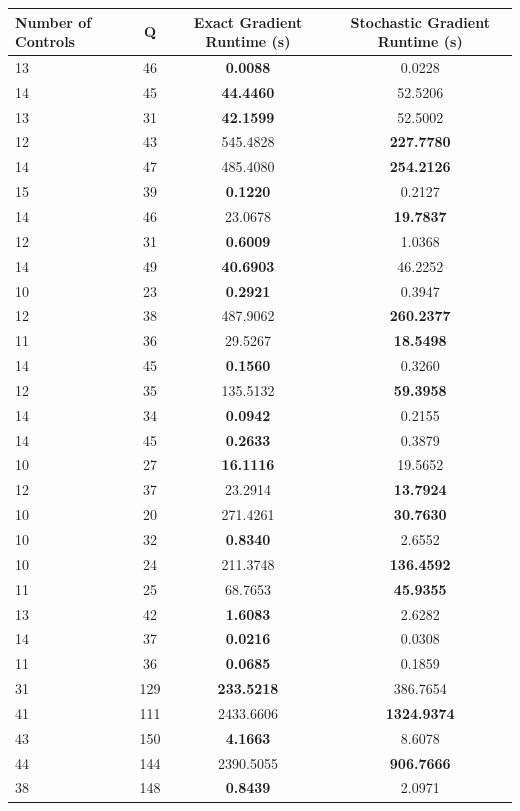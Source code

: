 \documentclass{article}
\begin{document}
\begin{table}[h]
\centering
\begin{tabular}{lccc}
\toprule
Number of Controls & Q & Exact Gradient Runtime (s) & Stochastic Gradient Runtime (s) \\
\midrule
13 & 46 & \textbf{0.0088} & 0.0228 \\
14 & 45 & \textbf{44.4460} & 52.5206 \\
13 & 31 & \textbf{42.1599} & 52.5002 \\
12 & 43 & 545.4828 & \textbf{227.7780} \\
14 & 47 & 485.4080 & \textbf{254.2126} \\
15 & 39 & \textbf{0.1220} & 0.2127 \\
14 & 46 & 23.0678 & \textbf{19.7837} \\
12 & 31 & \textbf{0.6009} & 1.0368 \\
14 & 49 & \textbf{40.6903} & 46.2252 \\
10 & 23 & \textbf{0.2921} & 0.3947 \\
12 & 38 & 487.9062 & \textbf{260.2377} \\
11 & 36 & 29.5267 & \textbf{18.5498} \\
14 & 45 & \textbf{0.1560} & 0.3260 \\
12 & 35 & 135.5132 & \textbf{59.3958} \\
14 & 34 & \textbf{0.0942} & 0.2155 \\
14 & 45 & \textbf{0.2633} & 0.3879 \\
10 & 27 & \textbf{16.1116} & 19.5652 \\
12 & 37 & 23.2914 & \textbf{13.7924} \\
10 & 20 & 271.4261 & \textbf{30.7630} \\
10 & 32 & \textbf{0.8340} & 2.6552 \\
10 & 24 & 211.3748 & \textbf{136.4592} \\
11 & 25 & 68.7653 & \textbf{45.9355} \\
13 & 42 & \textbf{1.6083} & 2.6282 \\
14 & 37 & \textbf{0.0216} & 0.0308 \\
11 & 36 & \textbf{0.0685} & 0.1859 \\
31 & 129 & \textbf{233.5218} & 386.7654 \\
41 & 111 & 2433.6606 & \textbf{1324.9374} \\
43 & 150 & \textbf{4.1663} & 8.6078 \\
44 & 144 & 2390.5055 & \textbf{906.7666} \\
38 & 148 & \textbf{0.8439} & 2.0971 \\

\end{tabular}
\end{table}
\end{document}

